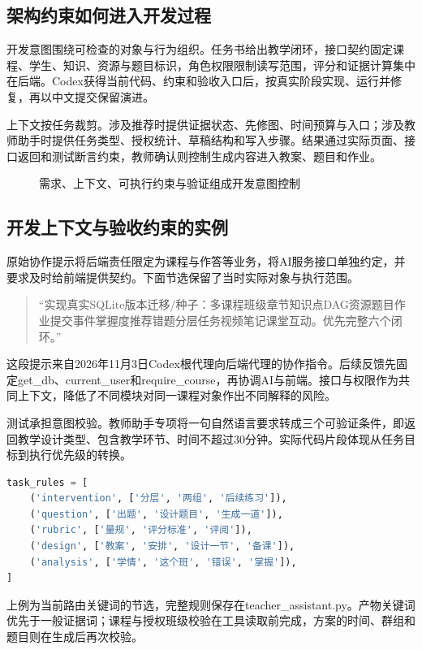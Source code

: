 \documentclass[UTF8,zihao=-4,fontset=none,a4paper]{ctexart}
\newcommand{\diagram}[2]{\par\begin{figure}[htbp]\centering\caption{#2}\end{figure}\par}
\begin{document}
\subsection{架构约束如何进入开发过程}
开发意图围绕可检查的对象与行为组织。任务书给出教学闭环，接口契约固定课程、学生、知识、资源与题目标识，角色权限限制读写范围，评分和证据计算集中在后端。Codex获得当前代码、约束和验收入口后，按真实阶段实现、运行并修复，再以中文提交保留演进。

上下文按任务裁剪。涉及推荐时提供证据状态、先修图、时间预算与入口；涉及教师助手时提供任务类型、授权统计、草稿结构和写入步骤。结果通过实际页面、接口返回和测试断言约束，教师确认则控制生成内容进入教案、题目和作业。
\diagram{intent-control}{需求、上下文、可执行约束与验证组成开发意图控制}

\subsection{开发上下文与验收约束的实例}
原始协作提示将后端责任限定为课程与作答等业务，将AI服务接口单独约定，并要求及时给前端提供契约。下面节选保留了当时实际对象与执行范围。
\begin{quote}
“实现真实SQLite版本迁移/种子：多课程班级章节知识点DAG资源题目作业提交事件掌握度推荐错题分层任务视频笔记课堂互动。优先完整六个闭环。”
\end{quote}
这段提示来自2026年11月3日Codex根代理向后端代理的协作指令。后续反馈先固定get\_db、current\_user和require\_course，再协调AI与前端。接口与权限作为共同上下文，降低了不同模块对同一课程对象作出不同解释的风险。

测试承担意图校验。教师助手专项将一句自然语言要求转成三个可验证条件，即返回教学设计类型、包含教学环节、时间不超过30分钟。实际代码片段体现从任务目标到执行优先级的转换。
\par\addvspace{12pt}\noindent\begin{minipage}[t]{\linewidth}\vspace{0pt}
\begin{lstlisting}[language=Python,aboveskip=0pt]
task_rules = [
    ('intervention', ['分层', '两组', '后续练习']),
    ('question', ['出题', '设计题目', '生成一道']),
    ('rubric', ['量规', '评分标准', '评阅']),
    ('design', ['教案', '安排', '设计一节', '备课']),
    ('analysis', ['学情', '这个班', '错误', '掌握']),
]
\end{lstlisting}
\end{minipage}\par\addvspace{10pt}
上例为当前路由关键词的节选，完整规则保存在teacher\_assistant.py。产物关键词优先于一般证据词；课程与授权班级校验在工具读取前完成，方案的时间、群组和题目则在生成后再次校验。
\end{document}

